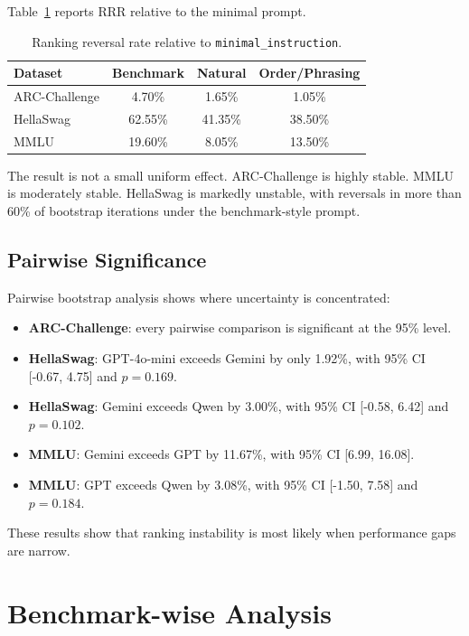 \documentclass[11pt]{article}
\begin{document}
Table~\ref{tab:rrr} reports RRR relative to the minimal prompt.

\begin{table}[H]
\centering
\caption{Ranking reversal rate relative to \texttt{minimal\_instruction}.}
\label{tab:rrr}
\begin{tabular}{lccc}
\toprule
Dataset & Benchmark & Natural & Order/Phrasing \\
\midrule
ARC-Challenge & 4.70\% & 1.65\% & 1.05\% \\
HellaSwag & 62.55\% & 41.35\% & 38.50\% \\
MMLU & 19.60\% & 8.05\% & 13.50\% \\
\bottomrule
\end{tabular}
\end{table}

The result is not a small uniform effect. ARC-Challenge is highly stable. MMLU is moderately stable. HellaSwag is markedly unstable, with reversals in more than 60\% of bootstrap iterations under the benchmark-style prompt.

\subsection{Pairwise Significance}

Pairwise bootstrap analysis shows where uncertainty is concentrated:
\begin{itemize}[leftmargin=1.5em]
\item \textbf{ARC-Challenge}: every pairwise comparison is significant at the 95\% level.
\item \textbf{HellaSwag}: GPT-4o-mini exceeds Gemini by only 1.92\%, with 95\% CI [-0.67, 4.75] and $p=0.169$.
\item \textbf{HellaSwag}: Gemini exceeds Qwen by 3.00\%, with 95\% CI [-0.58, 6.42] and $p=0.102$.
\item \textbf{MMLU}: Gemini exceeds GPT by 11.67\%, with 95\% CI [6.99, 16.08].
\item \textbf{MMLU}: GPT exceeds Qwen by 3.08\%, with 95\% CI [-1.50, 7.58] and $p=0.184$.
\end{itemize}

These results show that ranking instability is most likely when performance gaps are narrow.

\section{Benchmark-wise Analysis}
\end{document}
